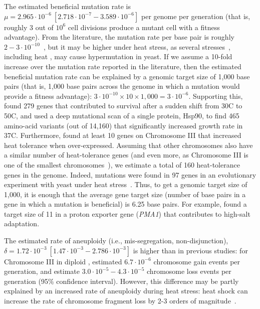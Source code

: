 \documentclass[12pt]{article}
\begin{document}
The estimated beneficial mutation rate is $\mu=2.965\cdot10^{-6}\ [2.718\cdot10^{-7}-3.589\cdot10^{-6}]$ per genome per generation (that is, roughly 3 out of $10^6$ cell divisions produce a mutant cell with a fitness advantage).
From the literature, the mutation rate per base pair is roughly $2-3\cdot10^{-10}$~\citep{Zhu2014,Lynch2008}, but it may be higher under heat stress, as several stresses~\citep{Heidenreich2007}, including heat \citep{Huang2018}, may cause hypermutation in yeast.
If we assume a 10-fold increase over the mutation rate reported in the literature, then the estimated beneficial mutation rate can be explained by a genomic target size of 1,000 base pairs (that is, 1,000 base pairs across the genome in which a mutation would provide a fitness advantage): $3\cdot10^{-10} \times 10 \times 1,000=3\cdot10^{-6}$.
Supporting this, \citet{Jarolim2013} found 279 genes that contributed to survival after a sudden shift from 30\degree C to 50\degree C, and \citet{Flynn2020} used a deep mutational scan of a single protein, Hsp90, to find 465 amino-acid variants (out of 14,160) that significantly increased growth rate in 37\degree C.
Furthermore, \citet{Yona2012} found at least 10 genes on Chromosome III that increased heat tolerance when over-expressed.
Assuming that other chromosomes also have a similar number of heat-tolerance genes (and even more, as Chromosome III is one of the smallest chromosomes~\citep{Gilchrist2019}), we estimate a total of 160 heat-tolerance genes in the genome.
Indeed, mutations were found in 97 genes in an evolutionary experiment with yeast under heat stress~\citep{Huang2018}.
Thus, to get a genomic target size of 1,000, it is enough that the average gene target size (number of base pairs in a gene in which a mutation is beneficial) is 6.25 base pairs. For example, \citet{Kohn2014} found a target size of 11 in a proton exporter gene (\emph{PMA1}) that contributes to high-salt adaptation.

The estimated rate of aneuploidy (i.e., mis-segregation, non-disjunction), $\delta=1.72\cdot10^{-3}\ [1.47\cdot10^{-3}-2.786\cdot10^{-3}]$ is higher than in previous studies: for Chromosome III in diploid \yeast, \citet{Zhu2014} estimated $6.7\cdot10^{-6}$ chromosome gain events per generation, and \citet{Kumaran2013} estimate $3.0\cdot10^{-5}-4.3\cdot10^{-5}$ chromosome loss events per generation (95\% confidence interval). 
However, this difference may be partly explained by an increased rate of aneuploidy during heat stress: heat shock can increase the rate of chromosome fragment loss by 2-3 orders of magnitude~\citep{Chen2012a}.
\end{document}
